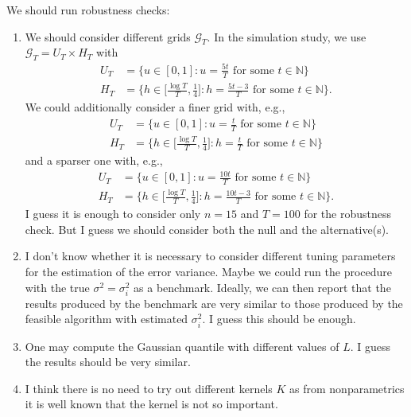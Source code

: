 \documentclass[a4paper,12pt]{article}
\begin{document}
\begin{enumerate}[label=\arabic*.,leftmargin=0.6cm]
{We should run robustness checks:
\begin{enumerate}[label=(\alph*),leftmargin=0.75cm,itemsep=0pt,topsep=0pt]
\item We should consider different grids $\mathcal{G}_T$. In the simulation study, we use $\mathcal{G}_T = U_T \times H_T$ with
\begin{align*}
U_T & = \big\{ u \in [0,1]: u = \textstyle{\frac{5t}{T}} \text{ for some } t \in \mathbb{N} \big\} \\
H_T & = \big\{ h \in \big[ \textstyle{\frac{\log T}{T}}, \textstyle{\frac{1}{4}} \big]:  h = \textstyle{\frac{5t - 3}{T}} \text{ for some } t \in \mathbb{N} \big\}.
\end{align*}
We could additionally consider a finer grid with, e.g.,
\begin{align*}
U_T & = \big\{ u \in [0,1]: u = \textstyle{\frac{t}{T}} \text{ for some } t \in \mathbb{N} \big\} \\
H_T & = \big\{ h \in \big[ \textstyle{\frac{\log T}{T}}, \textstyle{\frac{1}{4}} \big]:  h = \textstyle{\frac{t}{T}} \text{ for some } t \in \mathbb{N} \big\}
\end{align*}
and a sparser one with, e.g.,
\begin{align*}
U_T & = \big\{ u \in [0,1]: u = \textstyle{\frac{10t}{T}} \text{ for some } t \in \mathbb{N} \big\} \\
H_T & = \big\{ h \in \big[ \textstyle{\frac{\log T}{T}}, \textstyle{\frac{1}{4}} \big]:  h = \textstyle{\frac{10t - 3}{T}} \text{ for some } t \in \mathbb{N} \big\}.
\end{align*}
I guess it is enough to consider only $n=15$ and $T=100$ for the robustness check. But I guess we should consider both the null and the alternative(s). 
\item I don't know whether it is necessary to consider different tuning parameters for the estimation of the error variance. Maybe we could run the procedure with the true $\sigma^2 = \sigma_i^2$ as a benchmark. Ideally, we can then report that the results produced by the benchmark are very similar to those produced by the feasible algorithm with estimated $\sigma_i^2$. I guess this should be enough.
\item One may compute the Gaussian quantile with different values of $L$. I guess the results should be very similar.  
\item I think there is no need to try out different kernels $K$ as from nonparametrics it is well known that the kernel is not so important.
\end{enumerate}
}
  

\end{enumerate}
\end{document}
